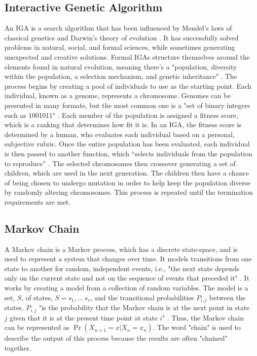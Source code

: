 \documentclass[12pt]{article} %
\begin{document}
\subsection{Interactive Genetic Algorithm}
An IGA is a search algorithm that has been influenced by Mendel's laws of classical genetics and Darwin's theory of evolution \cite{Jensen}. It has successfully solved problems in natural, social, and formal sciences, while sometimes generating unexpected and creative solutions. Formal IGAs structure themselves around the elements found in natural evolution, meaning there's a "population, diversity within the population, a selection mechanism, and genetic inheritance" \cite{Jensen}. The process begins by creating a pool of individuals to use as the starting point. Each individual, known as a genome, represents a chromosome. Genomes can be presented in many formats, but the most common one is a "set of binary integers such as 1001011" \cite{MIT}. Each member of the population is assigned a fitness score, which is a ranking that determines how fit it is. In an IGA, the fitness score is determined by a human, who evaluates each individual based on a personal, subjective rubric. Once the entire population has been evaluated, each individual is then passed to another function, which “selects individuals from the population to reproduce” \cite{MIT}. The selected chromosomes then crossover generating a set of children, which are used in the next generation. The children then have a chance of being chosen to undergo mutation in order to help keep the population diverse by randomly altering chromosomes. This process is repeated until the termination requirements are met.

\subsection{Markov Chain}
A Markov chain is a Markov process, which has a discrete state-space, and is used to represent a system that changes over time. It models transitions from one state to another for random, independent events, i.e., "the next state depends only on the current state and not on the sequence of events that preceded it" \cite{website:mc}. It works by creating a model from a collection of random variables. The model is a set, $S$, of states, $S=s_1,\ldots\,s_r$, and the transitional probabilities $P_{i,j}$ between the states. $P_{i,j}$ "is the probability that the Markov chain is at the next point in state $j$ given that it is at the present time point at state $i$" \cite{Ivo}. Thus, the Markov chain can be represented as $\Pr\left(X_{n+1}=x | X_n=x_n\right)$. The word "chain" is used to describe the output of this process because the results are often "chained" together. \\
\end{document}
